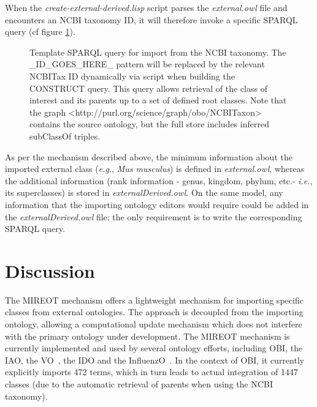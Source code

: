\documentclass{ao2e}%
\begin{document}
When the \emph{create-external-derived.lisp} script parses the \emph{external.owl} file and encounters an NCBI taxonomy ID, it will therefore invoke a specific SPARQL query (cf figure \ref{fig:sparql2}). 

\begin{figure}[t]
\scriptsize
 
\caption{Template SPARQL query for import from the NCBI taxonomy. The \_ID\_GOES\_HERE\_ pattern will be replaced by the relevant NCBITax ID dynamically via script when building the CONSTRUCT query. This query allows retrieval of the class of interest and its parents up to a set of defined root classes. Note that the graph <http://purl.org/science/graph/obo/NCBITaxon> contains the source ontology, but the full store includes inferred subClassOf triples.}
\label{fig:sparql2}
\end{figure}
As per the mechanism described above, the minimum information about the imported external class (\emph{e.g.}, \emph{Mus musculus}) is defined in \emph{external.owl}, whereas the additional information (rank information - genus, kingdom, phylum, etc.- \emph{i.e.}, its  superclasses) is stored in \emph{ externalDerived.owl}.
On the same model, any information that the importing ontology editors would require could be added in the \emph{externalDerived.owl} file: the only requirement is to write the corresponding SPARQL query.


\section*{Discussion}

The MIREOT mechanism offers a lightweight mechanism for importing specific classes from external ontologies. The approach is decoupled from the importing ontology, allowing a computational update mechanism which does not interfere with the primary ontology under development. The \ac{MIREOT} mechanism is currently implemented and used by several ontology efforts, including \ac{OBI}, the \ac{IAO}, the \ac{VO}~\cite{VO}, the \ac{IDO}\cite{IDO} and the \ac{InfluenzO}~\cite{InfluenzO}.
In the context of \ac{OBI}, it currently explicitly imports 472 terms, which in turn leads to actual integration of 1447 classes (due to the automatic retrieval of parents when using the NCBI taxonomy). 
\end{document}
